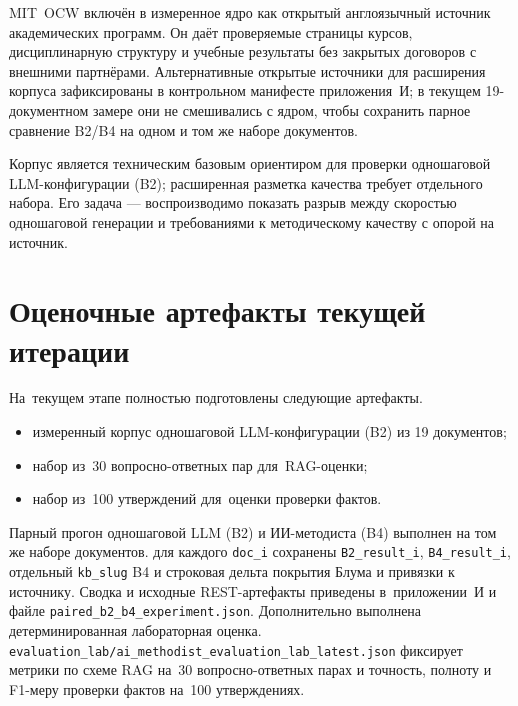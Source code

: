 MIT~OCW включён в измеренное ядро как открытый англоязычный источник
академических программ. Он даёт проверяемые страницы курсов, дисциплинарную
структуру и учебные результаты без закрытых договоров с внешними
партнёрами. Альтернативные открытые источники для расширения корпуса
зафиксированы в контрольном манифесте приложения~И; в текущем 19-документном
замере они не смешивались с ядром, чтобы сохранить парное сравнение B2/B4
на одном и том же наборе документов.

Корпус является техническим базовым ориентиром для проверки
одношаговой LLM-конфигурации (B2); расширенная разметка качества
требует отдельного набора. Его задача — воспроизводимо показать разрыв
между скоростью одношаговой генерации и требованиями к методическому качеству
с опорой на источник.

\section*{Оценочные артефакты текущей итерации}

На~текущем этапе полностью подготовлены следующие артефакты.
\begin{itemize}
  \item измеренный корпус одношаговой LLM-конфигурации (B2) из 19 документов;
  \item набор из~30 вопросно-ответных пар для~RAG-оценки;
  \item набор из~100 утверждений для~оценки проверки фактов.
\end{itemize}

Парный прогон одношаговой LLM (B2) и ИИ-методиста (B4) выполнен на том же наборе документов.
для каждого \texttt{doc\_i} сохранены \texttt{B2\_result\_i},
\texttt{B4\_result\_i}, отдельный \texttt{kb\_slug} B4 и строковая
дельта покрытия Блума и привязки к источнику. Сводка и исходные REST-артефакты приведены
в~приложении~И и файле \texttt{paired\_b2\_b4\_experiment.json}.
Дополнительно выполнена детерминированная лабораторная оценка.
\texttt{evaluation\_lab/ai\_methodist\_evaluation\_lab\_latest.json}
фиксирует метрики по схеме RAG на~30 вопросно-ответных парах и
точность, полноту и F1-меру проверки фактов на~100 утверждениях.
